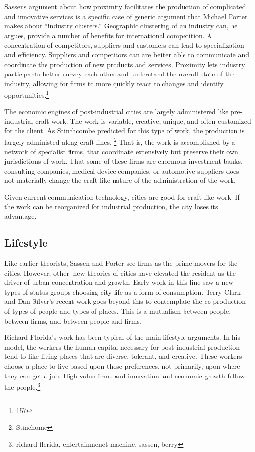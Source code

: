 Sassens argument about how proximity facilitates the production of
complicated and innovative services is a specific case of generic
argument that Michael Porter makes about ``industry clusters.''
Geographic clustering of an industry can, he argues, provide a number
of benefits for international competition. A concentration of
competitors, suppliers and customers can lead to specialization and
efficiency. Suppliers and competitors can are better able to
communicate and coordinate the production of new products and
services. Proximity lets industry participants better survey each
other and understand the overall state of the industry, allowing for
firms to more quickly react to changes and identify
opportunities.\footnote{157}

The economic engines of post-industrial cities are largely
administered like pre-industrial craft work. The work is variable,
creative, unique, and often customized for the client. As Stinchcombe
predicted for this type of work, the production is largely administed
along craft lines. \footnote{Stinchome} That is, the work is
accomplished by a network of specialist firms, that coordinate
extensively but preserve their own jurisdictions of work. That some of
these firms are enormous investment banks, consulting companies,
medical device companies, or automotive suppliers does not materially
change the craft-like nature of the administration of the work.

Given current communication technology, cities are good for craft-like
work. If the work can be reorganized for industrial production, the
city loses its advantage.

\subsection{Lifestyle}
Like earlier theorists, Sassen and Porter see firms as the prime
movers for the cities. However, other, new theories of cities have
elevated the resident as the driver of urban concentration and
growth. Early work in this line saw a new types of status groups
choosing city life as a form of consumption. Terry Clark and Dan
Silver's recent work goes beyond this to contemplate the co-production
of types of people and types of places. This is a mutualism between
people, between firms, and between people and firms.

Richard Florida's work has been typical of the main lifestyle
arguments. In his model, the workers the human capital necessary for
post-industrial production tend to like living places that are
diverse, tolerant, and creative. These workers choose a place to live
based upon those preferences, not primarily, upon where they can get a
job. High value firms and innovation and economic growth follow the
people.\footnote{richard florida, entertainmenet machine, sassen,
  berry}

